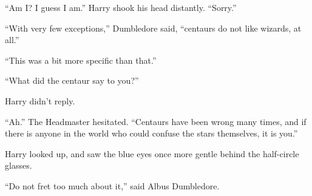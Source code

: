 ``Am I? I guess I am.'' Harry shook his head distantly. ``Sorry.''

``With very few exceptions,'' Dumbledore said, ``centaurs do not like
wizards, at all.''

``This was a bit more specific than that.''

``What did the centaur say to you?''

Harry didn't reply.

``Ah.'' The Headmaster hesitated. ``Centaurs have been wrong many times,
and if there is anyone in the world who could confuse the stars
themselves, it is you.''

Harry looked up, and saw the blue eyes once more gentle behind the
half-circle glasses.

``Do not fret too much about it,'' said Albus Dumbledore.
